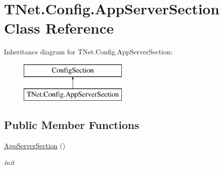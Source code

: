 \hypertarget{class_t_net_1_1_config_1_1_app_server_section}{}\section{T\+Net.\+Config.\+App\+Server\+Section Class Reference}
\label{class_t_net_1_1_config_1_1_app_server_section}


 


Inheritance diagram for T\+Net.\+Config.\+App\+Server\+Section\+:\begin{figure}[H]
\begin{center}
\leavevmode
\includegraphics[height=2.000000cm]{class_t_net_1_1_config_1_1_app_server_section}
\end{center}
\end{figure}
\subsection*{Public Member Functions}
\begin{DoxyCompactItemize}
\item 
\mbox{\hyperlink{class_t_net_1_1_config_1_1_app_server_section_aae29de60385fe9cfa193dd017eac5679}{App\+Server\+Section}} ()
\begin{DoxyCompactList}\small\item\em init \end{DoxyCompactList}\end{DoxyCompactItemize}
